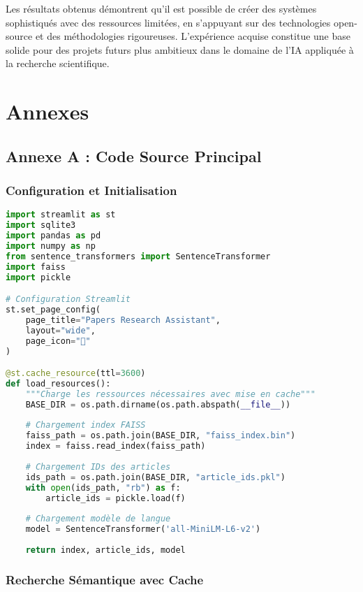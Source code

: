 \documentclass[12pt,a4paper]{article}
\begin{document}
Les résultats obtenus démontrent qu'il est possible de créer des systèmes sophistiqués avec des ressources limitées, en s'appuyant sur des technologies open-source et des méthodologies rigoureuses. L'expérience acquise constitue une base solide pour des projets futurs plus ambitieux dans le domaine de l'IA appliquée à la recherche scientifique.

\section{Annexes}

\subsection{Annexe A : Code Source Principal}

\subsubsection{Configuration et Initialisation}

\begin{lstlisting}[language=Python, caption=Configuration Streamlit et chargement des ressources]
import streamlit as st
import sqlite3
import pandas as pd
import numpy as np
from sentence_transformers import SentenceTransformer
import faiss
import pickle

# Configuration Streamlit
st.set_page_config(
    page_title="Papers Research Assistant",
    layout="wide",
    page_icon="🧠"
)

@st.cache_resource(ttl=3600)
def load_resources():
    """Charge les ressources nécessaires avec mise en cache"""
    BASE_DIR = os.path.dirname(os.path.abspath(__file__))
    
    # Chargement index FAISS
    faiss_path = os.path.join(BASE_DIR, "faiss_index.bin")
    index = faiss.read_index(faiss_path)
    
    # Chargement IDs des articles
    ids_path = os.path.join(BASE_DIR, "article_ids.pkl")
    with open(ids_path, "rb") as f:
        article_ids = pickle.load(f)
    
    # Chargement modèle de langue
    model = SentenceTransformer('all-MiniLM-L6-v2')
    
    return index, article_ids, model
\end{lstlisting}

\subsubsection{Recherche Sémantique avec Cache}
\end{document}
